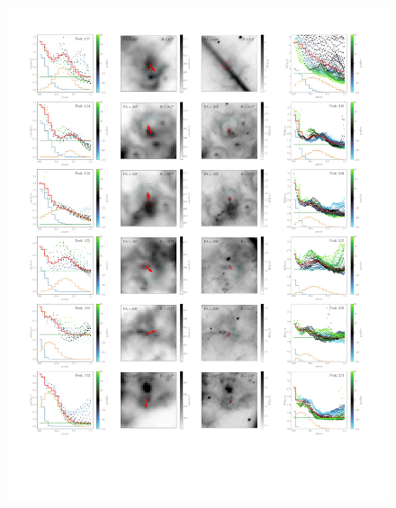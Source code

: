 \documentclass{book}
\begin{document}
\begin{figure}[htb]
    \centering
    \includegraphics[width=1.2\textwidth]{imagenes Chapter 4/ajustes_075324-2.pdf}
\end{figure}
\end{document}
